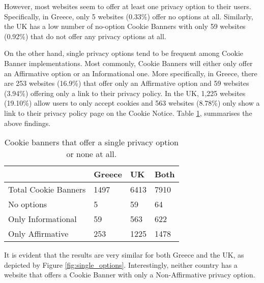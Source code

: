 \documentclass[../main.tex]{subfiles}
\begin{document}
However, most websites seem to offer at least one privacy option to their users. Specifically, in Greece, only 5 websites (0.33\%) offer no options at all. Similarly, the UK has a low number of no-option Cookie Banners with only 59 websites (0.92\%) that do not offer any privacy options at all. 

On the other hand, single privacy options tend to be frequent among Cookie Banner implementations. Most commonly, Cookie Banners will either only offer an Affirmative option or an Informational one. More specifically, in Greece, there are 253 websites (16.9\%) that offer only an Affirmative option and 59 websites (3.94\%) offering only a link to their privacy policy. In the UK, 1,225 websites (19.10\%) allow users to only accept cookies and 563 websites (8.78\%) only show a link to their privacy policy page on the Cookie Notice. Table \ref{tab:no_options_cookie_banners}, summarises the above findings.

\begin{table}[ht]
    \centering
    \begin{tabular}{@{}llll@{}}
        \toprule
                             & Greece & UK   & Both \\ \midrule
        Total Cookie Banners & 1497   & 6413 & 7910 \\
        No options           & 5      & 59   & 64   \\
        Only Informational   & 59     & 563  & 622  \\ 
        Only Affirmative     & 253    & 1225 & 1478 \\ \bottomrule
    \end{tabular}
    \caption{Cookie banners that offer a single privacy option or none at all.}
    \label{tab:no_options_cookie_banners}
\end{table}

It is evident that the results are very similar for both Greece and the UK, as depicted by Figure \ref{fig:single_options}. Interestingly, neither country has a website that offers a Cookie Banner with only a Non-Affirmative privacy option.

\dps
\end{document}
